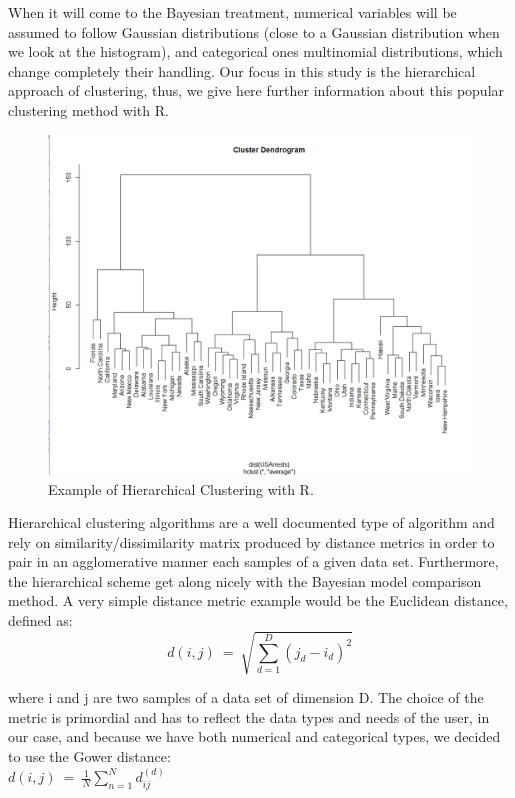\documentclass[twocolumn,12pt]{article}
\begin{document}
When it will come to the Bayesian treatment, numerical variables will be assumed to follow Gaussian distributions (close to a Gaussian distribution when we look at the histogram), and categorical ones multinomial distributions, which change completely their handling.
Our focus in this study is the hierarchical approach of clustering, thus, we give here further information about this popular clustering method with R.
\begin{figure}
    \centering
    \includegraphics[scale=0.2]{img/HC.png}
    \caption{Example of Hierarchical Clustering with R.}
    \label{fig:HC}
\end{figure}
Hierarchical clustering algorithms are a well documented type of algorithm and rely on similarity/dissimilarity matrix produced by distance metrics in order to pair in an agglomerative manner each samples of a given data set.
Furthermore, the hierarchical scheme get along nicely with the Bayesian model comparison method.
A very simple distance metric example would be the Euclidean distance, defined as:\\
$$d(i,j)\ =\ \sqrt{\sum_{d=1}^D(j_d-i_d)^2}$$


where i and j are two samples of a data set of dimension D.
The choice of the metric is primordial and has to reflect the data types and needs of the user, in our case, and because we have both numerical and categorical types, we decided to use the Gower distance:\\
$d(i,j)\ =\ \frac{1}{N}\sum_{n=1}^Nd_{ij}^{(d)}$\\
\end{document}
